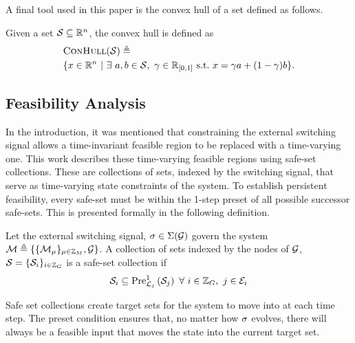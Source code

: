 A final tool used in this paper is the convex hull of a set defined as follows.
\begin{definition}
Given a set $\mathcal{S}\subseteq\real^n$, the convex hull is defined as 
\begin{align*}
&\Call{ConHull}{\mathcal{S}}\triangleq\\&\{x\in\real^n\ |\ \exists\ a,b\in\mathcal{S},\ \gamma\in\real\rii{0}{1}\ \text{s.t.}\ x=\gamma a + (1-\gamma)b\}.
\end{align*}
\end{definition}
\subsection{Feasibility Analysis}
In the introduction, it was mentioned that constraining the external switching signal allows a time-invariant feasible region to be replaced with a time-varying one. This work describes these time-varying feasible regions using safe-set collections. These are collections of sets, indexed by the switching signal, that serve as time-varying state constraints of the system. To establish persistent feasibility, every safe-set must be within the 1-step preset of all possible successor safe-sets. This is presented formally in the following definition.
\begin{definition}
Let the external switching signal, $\ss\in\Sigma(\graph)$ govern the system $\modes\triangleq\{\{\mode{\modeidx}\}_{\modeidx\in\idxset{\nummodes}}, \graph\}$. A collection of sets indexed by the nodes of $\graph$, $\mathcal{S}=\{\mathcal{S}_{i}\}_{i\in\idxset{\gnumnodes}}$ is a safe-set collection if
$$\mathcal{S}_{i}\subseteq\Pre[\gnodelabel{j}][1]{\mathcal{S}_{j}}\ \forall\ i\in\idxset{\gnumnodes},\ j\in \gnodeedges{i}$$
\end{definition}
Safe set collections create target sets for the system to move into at each time step. The preset condition ensures that, no matter how $\ss$ evolves, there will always be a feasible input that moves the state into the current target set.
